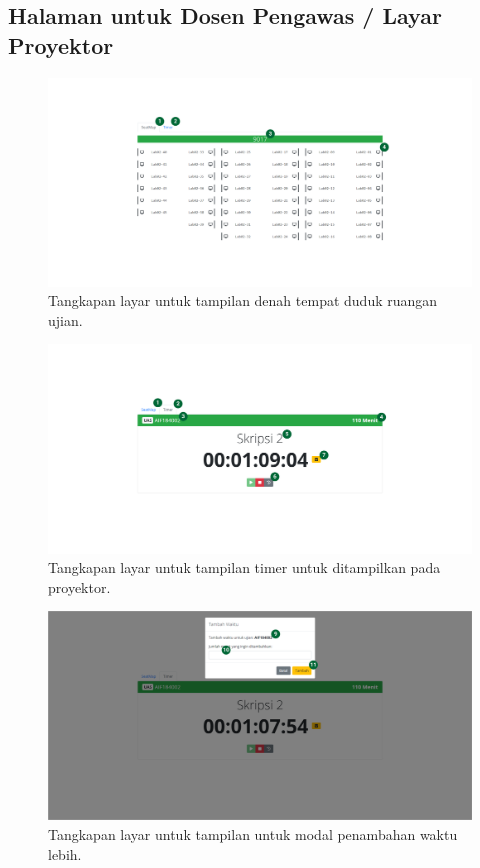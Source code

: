     \subsection{Halaman untuk Dosen Pengawas / Layar Proyektor}
    \begin{figure}
        \centering
        \includegraphics[width=0.7\paperwidth]{Gambar/implemented-interface/pengawas/seatmap.png}
        \caption{Tangkapan layar untuk tampilan denah tempat duduk ruangan ujian.}
        \label{fig:screenshot-pengawas-seatmap}
    \end{figure}
    \begin{figure}
        \centering
        \includegraphics[width=0.7\paperwidth]{Gambar/implemented-interface/pengawas/timer.png}
        \caption{Tangkapan layar untuk tampilan timer untuk ditampilkan pada proyektor.}
        \label{fig:screenshot-pengawas-timer}
    \end{figure}
    \begin{figure}
        \centering
        \includegraphics[width=0.7\paperwidth]{Gambar/implemented-interface/pengawas/overtime.png}
        \caption{Tangkapan layar untuk tampilan untuk modal penambahan waktu lebih.}
        \label{fig:screenshot-pengawas-overtime}
    \end{figure}
